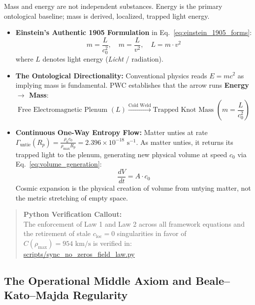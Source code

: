 \documentclass[11pt,a4paper]{article}
\begin{document}
Mass and energy are not independent substances. Energy is the primary ontological baseline; mass is derived, localized, trapped light energy.
\begin{itemize}
    \item \textbf{Einstein's Authentic 1905 Formulation} in Eq.~\eqref{eq:einstein_1905_forms}:
    \begin{equation}
    m = \frac{L}{c_0^2}, \quad m = \frac{L}{v^2}, \quad L = m \cdot v^2
    \label{eq:einstein_1905_forms}
    \end{equation}
    where $L$ denotes light energy (\textit{Licht} / radiation).
    \item \textbf{The Ontological Directionality:} Conventional physics reads $E = mc^2$ as implying mass is fundamental. PWC establishes that the arrow runs \textbf{Energy $\rightarrow$ Mass}:
    \begin{equation}
    \text{Free Electromagnetic Plenum } (L) \xrightarrow{\text{Cold Weld}} \text{Trapped Knot Mass } \left(m = \frac{L}{c_0^2}\right)
    \end{equation}
    \item \textbf{Continuous One-Way Entropy Flow:} Matter unties at rate $\Gamma_{\text{untie}}(R_p) = \frac{\rho_0 c_0}{\rho_{\max} R_p} = 2.396 \times 10^{-18}\text{ s}^{-1}$. As matter unties, it returns its trapped light to the plenum, generating new physical volume at speed $c_0$ via Eq.~\eqref{eq:volume_generation}:
    \begin{equation}
    \frac{dV}{dt} = A \cdot c_0
    \label{eq:volume_generation}
    \end{equation}
    Cosmic expansion is the physical creation of volume from untying matter, not the metric stretching of empty space.
\end{itemize}

\begin{quote}
\textbf{Python Verification Callout:}\\
The enforcement of Law 1 and Law 2 across all framework equations and the retirement of stale $c_{\text{loc}}=0$ singularities in favor of $C(\rho_{\max}) = 954\text{ km/s}$ is verified in:\\
\url{scripts/sync_no_zeros_field_law.py}
\end{quote}


\subsection{The Operational Middle Axiom and Beale--Kato--Majda Regularity}
\label{subsec:operational_middle}
\end{document}
